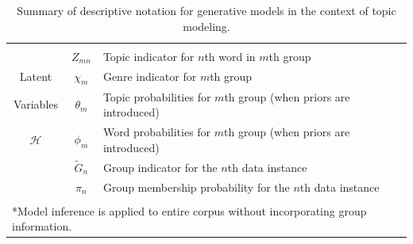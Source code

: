 \begin{table}[h]
\begin{center}
{\begin{tabular}{ ccl%
}
 \hline\\[-3mm]
 &$ Z_{mn} $ & Topic  indicator for $n$th word in $m$th group \\
 Latent   & $ \chi_{m} $ & Genre  indicator for  $m$th group  \\
Variables & $ \theta_{m} $ & Topic probabilities for $m$th group (when priors are introduced)  \\
$\mathcal{H}$  & $ \phi_{m} $ & Word probabilities for $m$th group (when priors are introduced)  \\
& $\tilde{G}_n $ & Group indicator for the $n$th data instance \\
& $\pi_n $ & Group membership probability for the $n$th data instance \\[2mm]
\hline \\[-3mm]
 \multicolumn{3}{l}{*Model inference is applied to  entire corpus without incorporating group information.} \\ 
\end{tabular}
}
\end{center}
 \caption{Summary of descriptive notation for generative models  in the context of topic modeling. }
 \label{Notation}
\end{table} 

